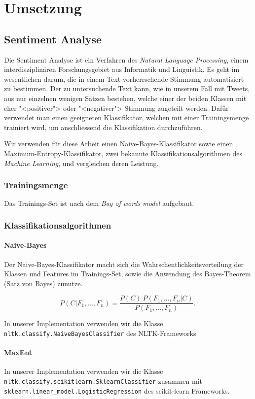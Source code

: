\documentclass[12pt, oneside]{report}   	%
\begin{document}
\chapter{Umsetzung}

\section{Sentiment Analyse}
Die Sentiment Analyse ist ein Verfahren des \emph{Natural Language Processing}, einem interdisziplinären Forschungsgebiet aus Informatik und Linguistik.
Es geht im wesentlichen darum, die in einem Text vorherrschende Stimmung automatisiert zu bestimmen. 
Der zu untersuchende Text kann, wie in unserem Fall mit Tweets, aus nur einzelnen wenigen Sätzen bestehen, welche einer der beiden Klassen mit eher "<positiver"> oder "<negativer"> Stimmung zugeteilt werden.
Dafür verwendet man einen geeigneten Klassifikator, welchen  mit einer Trainingsmenge trainiert wird, um anschliessend die Klassifikation durchzuführen. 

Wir verwenden für diese Arbeit einen Naive-Bayes-Klassifikator sowie einen Maximum-Entropy-Klassifikator, zwei bekannte Klassifikationsalgorithmen des \emph{Machine Learning}, und vergleichen deren Leistung.


\subsection{Trainingsmenge}
Das Trainings-Set ist nach dem \emph{Bag of words model} aufgebaut.

\subsection{Klassifikationsalgorithmen}
\subsubsection{Naive-Bayes}

Der Naive-Bayes-Klassifikator macht sich die Wahrschentlichkeitsverteilung der Klassen und Features im Trainings-Set, sowie die Anwendung des Bayes-Theorem (Satz von Bayes) zunutze.

$$
P(C \vert F_1,\dots,F_n) = \frac{P(C) \ P(F_1,\dots,F_n\vert C)}{P(F_1,\dots,F_n)}. \,
$$


In unserer Implementation verwenden wir die Klasse\\
 \verb|nltk.classify.NaiveBayesClassifier| des NLTK-Frameworks

\subsubsection{MaxEnt}
In unserer Implementation verwenden wir die Klasse\\
\verb|nltk.classify.scikitlearn.SklearnClassifier| zusammen mit\\
\verb|sklearn.linear_model.LogisticRegression| des scikit-learn Frameworks.
\end{document}

